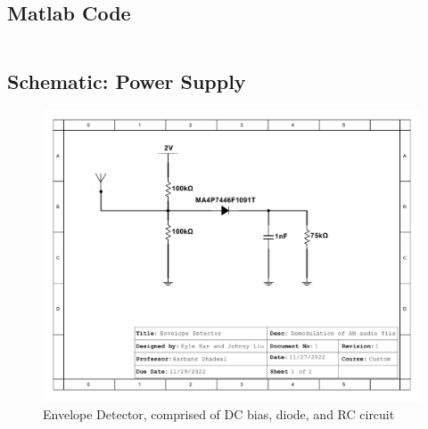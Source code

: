 \subsection{Matlab Code}


\inputminted[breaklines]{Matlab}{./Code/Demodulator.m}

\subsection{Schematic: Power Supply}
\begin{figure}[H]
    \centering
    \includegraphics[width = 1\textwidth]{Appendices/Demodulator.pdf}
    \caption{Envelope Detector, comprised of DC bias, diode, and RC circuit}
    \label{fig:Demodulator}
\end{figure}
